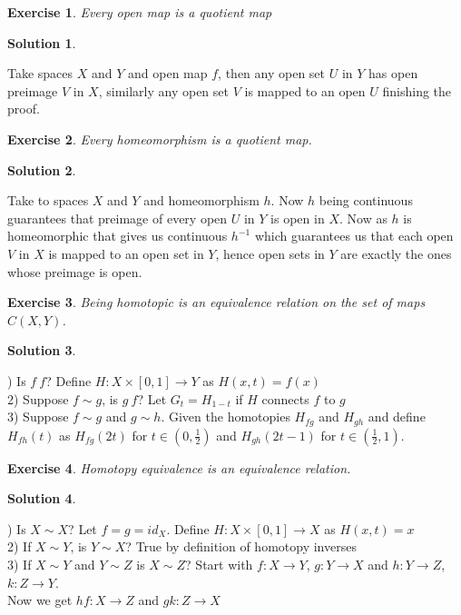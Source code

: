 \documentclass[11pt,a4paper]{article}
\newtheorem{Ex}{Exercise}
\newtheorem{Sol}{Solution}
\newcommand{\ra}{\rightarrow}
\begin{document}
\begin{Ex}
	Every open map is a quotient map
\end{Ex}

\begin{Sol}\end{Sol}
\noindent Take spaces $X$ and $Y$ and open map $f$, then any open set $U$ in $Y$ has open preimage $V$ in $X$, similarly any open set $V$ is mapped to an open $U$ finishing the proof.

\begin{Ex}
	Every homeomorphism is a quotient map.
\end{Ex}

\begin{Sol}\end{Sol}
\noindent Take to spaces $X$ and $Y$ and homeomorphism $h$. Now $h$ being continuous guarantees that preimage of every open $U$ in $Y$ is open in $X$. Now as $h$ is homeomorphic that gives us continuous $h^{-1}$ which guarantees us that each open $V$ in $X$ is mapped to an open set in $Y$, hence open sets in $Y$ are exactly the ones whose preimage is open.    

\begin{Ex}
	Being homotopic is an equivalence relation on the set of maps $C(X,Y)$.
\end{Ex}
\begin{Sol}\end{Sol}
) Is $f~f$? Define $H: X \times [0,1] \rightarrow Y$ as $H(x,t) = f(x)$ \\
2) Suppose $f \sim g$, is $g~f$? Let $G_t = H_{1-t}$ if $H$ connects $f$ to $g$ \\
3) Suppose $f \sim g$ and $g \sim h$. Given the homotopies $H_{fg}$ and $H_{gh}$ and define $H_{fh}(t)$ as $H_{fg}(2t)$ for $t \in (0,\frac{1}{2})$ and $H_{gh}(2t-1)$ for $t\in (\frac{1}{2},1)$.    

\begin{Ex}
	Homotopy equivalence is an equivalence relation.
\end{Ex}

\begin{Sol}\end{Sol}
) Is $X\sim X$? Let $f = g = id_X$. Define $H: X \times [0,1] \rightarrow X$ as $H(x,t)=x$ \\
2) If $X \sim Y$, is $Y \sim X$? True by definition of homotopy inverses \\
3) If $X \sim Y$ and $Y \sim Z$ is $X \sim Z$? Start with $f: X \ra Y$, $g : Y \ra X$ and $h: Y \ra Z$, $k: Z \ra Y$. \\ 
Now we get $hf: X \ra Z$ and $gk: Z \ra X$
\end{document}
